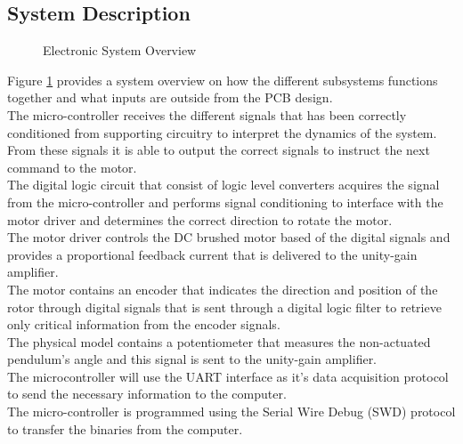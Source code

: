 \subsection{System Description}

\begin{figure}[h]
	\centering
	
	\caption{Electronic System Overview}
	\label{fig:electronicSystemOverview}
\end{figure}



Figure \ref{fig:electronicSystemOverview} provides a system overview on how the different subsystems functions together and what inputs are outside from the PCB design.\\

The micro-controller receives the different signals that has been correctly conditioned from supporting circuitry to interpret the dynamics of the system. From these signals it is able to output the correct signals to instruct the next command to the motor.\\

The digital logic circuit that consist of logic level converters acquires the signal from the micro-controller and performs signal conditioning to interface with the motor driver and determines the correct direction to rotate the motor. \\

The motor driver controls the DC brushed motor based of the digital signals and provides a proportional feedback current that is delivered to the unity-gain amplifier.\\

The motor contains an encoder that indicates the direction and position of the rotor through digital signals that is sent through a digital logic filter to retrieve only critical information from the encoder signals. \\

The physical model contains a potentiometer that measures the non-actuated pendulum's angle and this signal is sent to the unity-gain amplifier.\\

The microcontroller will use the UART interface as it's data acquisition protocol to send the necessary information to the computer. \\

The micro-controller is programmed using the Serial Wire Debug (SWD) protocol to transfer the binaries from the computer.\\

